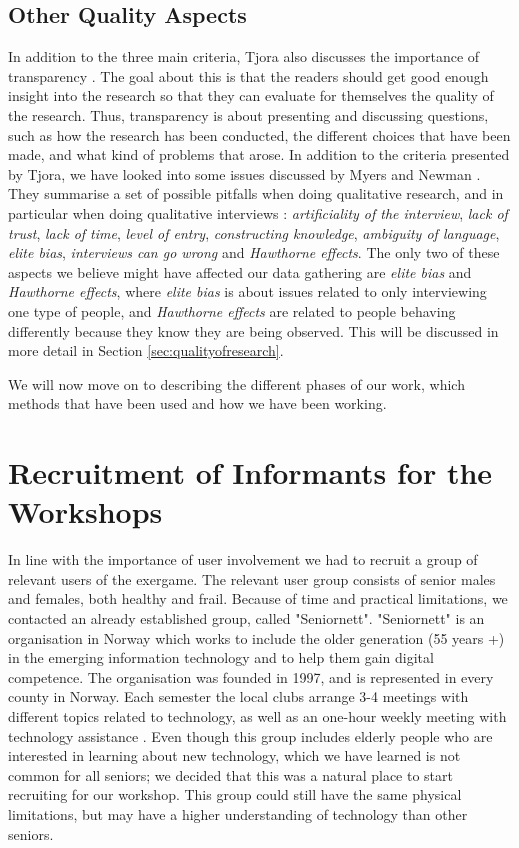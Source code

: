\subsection{Other Quality Aspects}
\label{sec:otherQualityAspects}
In addition to the three main criteria, Tjora also discusses the importance of transparency \cite{tjora}. The goal about this is that the readers should get good enough insight into the research so that they can evaluate for themselves the quality of the research. Thus, transparency is about presenting and discussing questions, such as how the research has been conducted, the different choices that have been made, and  what kind of problems that arose. In addition to the criteria presented by Tjora, we have looked into some issues discussed by Myers and Newman \cite{interview}. They summarise a set of possible pitfalls when doing qualitative research, and in particular when doing qualitative interviews \cite{interview}: \emph{artificiality of the interview}, \emph{lack of trust}, \emph{lack of time}, \emph{level of entry}, \emph{constructing knowledge}, \emph{ambiguity of language}, \emph{elite bias}, \emph{interviews can go wrong} and \emph{Hawthorne effects}. The only two of these aspects we believe might have affected our data gathering are \emph{elite bias} and \emph{Hawthorne effects}, where \emph{elite bias} is about issues related to only interviewing one type of people, and \emph{Hawthorne effects} are related to people behaving differently because they know they are being observed. This will be discussed in more detail in Section \ref{sec:qualityofresearch}.

We will now move on to describing the different phases of our work, which methods that have been used and how we have been working. 

\section{Recruitment of Informants for the Workshops}
\label{sec:recruitment}
In line with the importance of user involvement we had to recruit a group of relevant users of the exergame. The relevant user group consists of senior males and females, both healthy and frail. Because of time and practical limitations, we contacted an already established group, called "Seniornett". "Seniornett" is an organisation in Norway which works to include the older generation (55 years +) in the emerging information technology and to help them gain digital competence. The organisation was founded in 1997, and is represented in every county in Norway. Each semester the local clubs arrange 3-4 meetings with different topics related to technology, as well as an one-hour weekly meeting with technology assistance \cite{seniornett}. Even though this group includes elderly people who are interested in learning about new technology, which we have learned is not common for all seniors; we decided that this was a natural place to start recruiting for our workshop. This group could still have the same physical limitations, but may have a higher understanding of technology than other seniors. 

